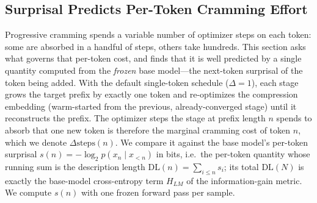 

\subsection{Surprisal Predicts Per-Token Cramming Effort}
\label{app:surprisal_steps}

Progressive cramming spends a variable number of optimizer steps on each token: some are absorbed in
a handful of steps, others take hundreds. This section asks what governs that per-token cost, and
finds that it is well predicted by a single quantity computed from the \emph{frozen} base model---the
next-token surprisal of the token being added. With the default single-token schedule ($\Delta = 1$),
each stage grows the target prefix by exactly one token and re-optimizes the compression embedding
(warm-started from the previous, already-converged stage) until it reconstructs the prefix. The
optimizer steps the stage at prefix length $n$ spends to absorb that one new token is therefore the
marginal cramming cost of token $n$, which we denote $\Delta\text{steps}(n)$.
We compare it against the base model's per-token surprisal
$s(n) = -\log_2 p(x_n \mid x_{<n})$ in bits, i.e.\ the per-token quantity whose running sum is the
description length $\mathrm{DL}(n)=\sum_{i\le n} s_i$; its total $\mathrm{DL}(N)$ is exactly the
base-model cross-entropy term $H_{LM}$ of the information-gain metric. We compute $s(n)$ with one
frozen forward pass per sample.

